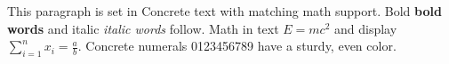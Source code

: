 \documentclass{article}
\begin{document}
This paragraph is set in Concrete text with matching math support.
Bold \textbf{bold words} and italic \textit{italic words} follow.
Math in text $E = mc^2$ and display $\sum_{i=1}^{n} x_i = \frac{a}{b}$.
Concrete numerals 0123456789 have a sturdy, even color.
\end{document}
